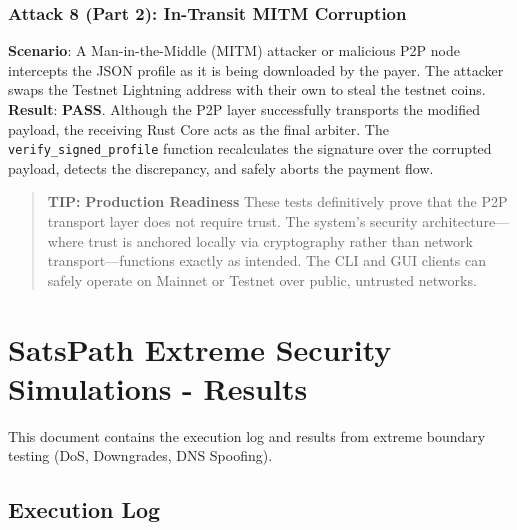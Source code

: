 \documentclass[
]{article}
\begin{document}
\hypertarget{attack-8-part-2-in-transit-mitm-corruption}{%
\subsubsection{Attack 8 (Part 2): In-Transit MITM
Corruption}\label{attack-8-part-2-in-transit-mitm-corruption}}

\textbf{Scenario}: A Man-in-the-Middle (MITM) attacker or malicious P2P
node intercepts the JSON profile as it is being downloaded by the payer.
The attacker swaps the Testnet Lightning address with their own to steal
the testnet coins. \textbf{Result}: \textbf{PASS}. Although the P2P
layer successfully transports the modified payload, the receiving Rust
Core acts as the final arbiter. The \texttt{verify\_signed\_profile}
function recalculates the signature over the corrupted payload, detects
the discrepancy, and safely aborts the payment flow.

\begin{quote}
\textbf{TIP:} \textbf{Production Readiness} These tests definitively
prove that the P2P transport layer does not require trust. The system's
security architecture---where trust is anchored locally via cryptography
rather than network transport---functions exactly as intended. The CLI
and GUI clients can safely operate on Mainnet or Testnet over public,
untrusted networks.
\end{quote}

\hypertarget{satspath-extreme-security-simulations---results}{%
\section{SatsPath Extreme Security Simulations -
Results}\label{satspath-extreme-security-simulations---results}}

This document contains the execution log and results from extreme
boundary testing (DoS, Downgrades, DNS Spoofing).

\hypertarget{execution-log-4}{%
\subsection{Execution Log}\label{execution-log-4}}
\end{document}
